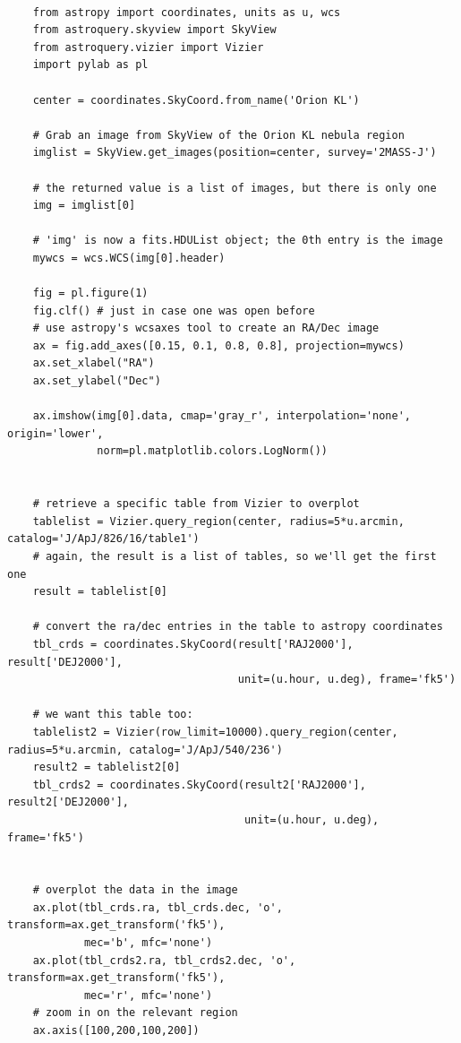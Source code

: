 \documentclass[twocolumn]{aastex61}
\begin{document}
\begin{lstlisting}

    from astropy import coordinates, units as u, wcs
    from astroquery.skyview import SkyView
    from astroquery.vizier import Vizier
    import pylab as pl

    center = coordinates.SkyCoord.from_name('Orion KL')

    # Grab an image from SkyView of the Orion KL nebula region
    imglist = SkyView.get_images(position=center, survey='2MASS-J')

    # the returned value is a list of images, but there is only one
    img = imglist[0]

    # 'img' is now a fits.HDUList object; the 0th entry is the image
    mywcs = wcs.WCS(img[0].header)

    fig = pl.figure(1)
    fig.clf() # just in case one was open before
    # use astropy's wcsaxes tool to create an RA/Dec image
    ax = fig.add_axes([0.15, 0.1, 0.8, 0.8], projection=mywcs)
    ax.set_xlabel("RA")
    ax.set_ylabel("Dec")
    
    ax.imshow(img[0].data, cmap='gray_r', interpolation='none', origin='lower',
              norm=pl.matplotlib.colors.LogNorm())


    # retrieve a specific table from Vizier to overplot
    tablelist = Vizier.query_region(center, radius=5*u.arcmin, catalog='J/ApJ/826/16/table1')
    # again, the result is a list of tables, so we'll get the first one
    result = tablelist[0]

    # convert the ra/dec entries in the table to astropy coordinates
    tbl_crds = coordinates.SkyCoord(result['RAJ2000'], result['DEJ2000'],
                                    unit=(u.hour, u.deg), frame='fk5')

    # we want this table too:
    tablelist2 = Vizier(row_limit=10000).query_region(center, radius=5*u.arcmin, catalog='J/ApJ/540/236')
    result2 = tablelist2[0]
    tbl_crds2 = coordinates.SkyCoord(result2['RAJ2000'], result2['DEJ2000'],
                                     unit=(u.hour, u.deg), frame='fk5')


    # overplot the data in the image
    ax.plot(tbl_crds.ra, tbl_crds.dec, 'o', transform=ax.get_transform('fk5'),
            mec='b', mfc='none')
    ax.plot(tbl_crds2.ra, tbl_crds2.dec, 'o', transform=ax.get_transform('fk5'),
            mec='r', mfc='none')
    # zoom in on the relevant region
    ax.axis([100,200,100,200])
    
\end{lstlisting}
\end{document}
